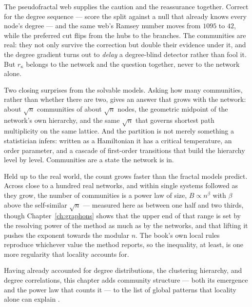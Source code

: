 The pseudofractal web supplies the caution and the reassurance together. Correct
for the degree sequence --- score the split against a null that already knows every
node's degree --- and the same web's Ramsey number moves from $1095$ to $42$, while
the preferred cut flips from the hubs to the branches. The communities are real:
they not only survive the correction but double their evidence under it, and the
degree gradient turns out to \emph{delay} a degree-blind detector rather than fool
it. But $r_\kappa$ belongs to the network and the question together, never to the
network alone.

Two closing surprises from the solvable models. Asking how many communities,
rather than whether there are two, gives an answer that grows with the network:
about $\sqrt{n}$ communities of about $\sqrt{n}$ nodes, the geometric midpoint of
the network's own hierarchy, and the same $\sqrt{n}$ that governs shortest path
multiplicity on the same lattice. And the partition is not merely something a
statistician infers: written as a Hamiltonian it has a critical temperature, an
order parameter, and a cascade of first-order transitions that build the hierarchy
level by level. Communities are a state the network is in.

Held up to the real world, the count grows faster than the fractal models predict.
Across close to a hundred real networks, and within single systems followed as
they grow, the number of communities is a power law of size, $B\propto n^{\beta}$
with $\beta$ above the self-similar $\sqrt{n}$ --- measured here as between one
half and two thirds, though Chapter~\ref{ch:graphons} shows that the upper end of
that range is set by the resolving power of the method as much as by the
networks, and that lifting it pushes the exponent towards the modular $n$. The
book's own local rules reproduce whichever value the method reports, so the
inequality, at least, is one more regularity that locality accounts for.

Having already accounted for degree distributions, the clustering hierarchy, and
degree correlations, this chapter adds community structure --- both its emergence
and the power law that counts it --- to the list of global patterns that locality
alone can explain \citep{vazquez2025}.
